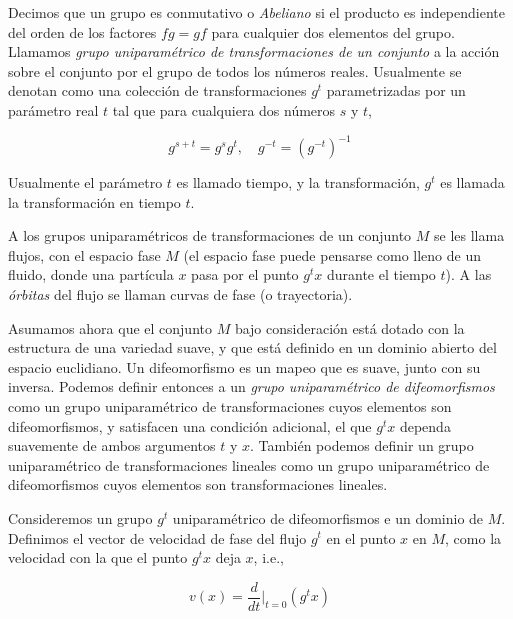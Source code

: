 \documentclass[a4paper,10pt]{article}
\numberwithin{equation}{section}
\begin{document}
\vspace{.3cm}

Decimos que un grupo es conmutativo o \emph{Abeliano} si el producto es 
independiente del orden de los factores $fg = gf$ para cualquier dos elementos
del grupo. Llamamos \emph{grupo uniparamétrico de transformaciones de un 
conjunto} a la acción sobre el conjunto por el grupo de todos los números reales.
Usualmente se denotan como una colección de transformaciones $g^t$ parametrizadas
por un parámetro real $t$ tal que para cualquiera dos números $s$ y $t$,

\begin{equation}
 g^{s+t} = g^s g^t, \quad g^{-t} = (g^{-t})^{-1}
\end{equation}

Usualmente el parámetro $t$ es llamado tiempo, y la transformación, 
$g^t$ es llamada la transformación en tiempo $t$. 

\vspace{.3cm}

A los grupos uniparamétricos de transformaciones de un conjunto $M$ se 
les llama flujos, con el espacio fase $M$ (el espacio fase puede pensarse
como lleno de un fluido, donde una partícula $x$ pasa por el punto $g^t x$
durante el tiempo $t$). A las \emph{órbitas} del flujo se llaman curvas
de fase (o trayectoria).

\vspace{.3cm}

Asumamos ahora que el conjunto $M$ bajo consideración está dotado con la estructura
de una variedad suave, y que está definido en un dominio abierto del 
espacio euclidiano. Un difeomorfismo es un mapeo que es suave, junto
con su inversa. Podemos definir entonces a un \emph{grupo uniparamétrico de 
difeomorfismos} como un grupo uniparamétrico de transformaciones cuyos elementos
son difeomorfismos, y satisfacen una condición adicional, el que $g^t x$ 
dependa suavemente de ambos argumentos $t$ y $x$. También podemos 
definir un grupo uniparamétrico de transformaciones lineales como un 
grupo uniparamétrico de difeomorfismos cuyos elementos son transformaciones
lineales.

\vspace{.3cm}

Consideremos un grupo $g^t$ uniparamétrico de difeomorfismos e un dominio
de $M$. Definimos el vector de velocidad de fase del flujo $g^t$ en el
punto $x$ en $M$, como la velocidad con la que el punto $g^t x$ deja $x$, i.e.,

\begin{equation}
 v(x) = \frac{d}{dt} |_{t=0} (g^t x)
\end{equation}
\end{document}
